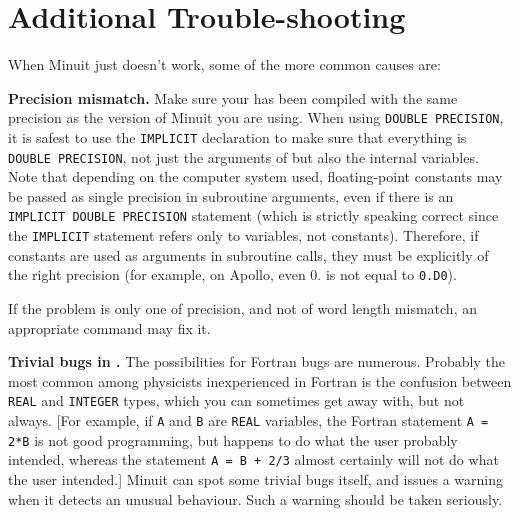 \section{Additional Trouble-shooting}

When Minuit just doesn't work, some of the more common causes are:

\begin{UL}
\item {\bf Precision mismatch.}
      Make sure your  has been compiled with the same precision as the
      version of Minuit you are using.
      When using \texttt{DOUBLE PRECISION}, it is safest to use the \texttt{IMPLICIT}
      declaration to make sure that everything is \texttt{DOUBLE PRECISION}, not
      just the arguments of  but also the internal variables.
      Note that depending on the computer system used, floating-point
      constants may be passed as single precision in subroutine arguments,
      even if there is an \texttt{IMPLICIT DOUBLE PRECISION} statement
      (which is strictly speaking correct since the \texttt{IMPLICIT} statement
      refers only to variables, not constants).
      Therefore, if constants are used as arguments in subroutine calls,
      they must be explicitly of the right precision (for example, on Apollo,
      even 0. is not equal to \texttt{0.D0}).
       
      If the problem is only one of precision, and not of word length mismatch,
      an appropriate  command may fix it.
\item {\bf Trivial bugs in .}
      The possibilities for Fortran bugs are numerous. Probably the most
      common among physicists inexperienced in Fortran is the confusion
      between \texttt{REAL} and \texttt{INTEGER} types, 
      which you can sometimes get away with, but not always.
      [For example, if \texttt{A} and \texttt{B} are \texttt{REAL} variables, 
      the Fortran statement \texttt{A = 2*B}   is not good programming, 
      but happens to do what the user
      probably intended, whereas the statement   \texttt{A = B + 2/3}   almost
      certainly will not do what the user intended.]
      Minuit can spot some trivial bugs itself, and issues
      a warning when it detects an unusual  behaviour.  Such a warning
      should be taken seriously.
       

\end{UL}
